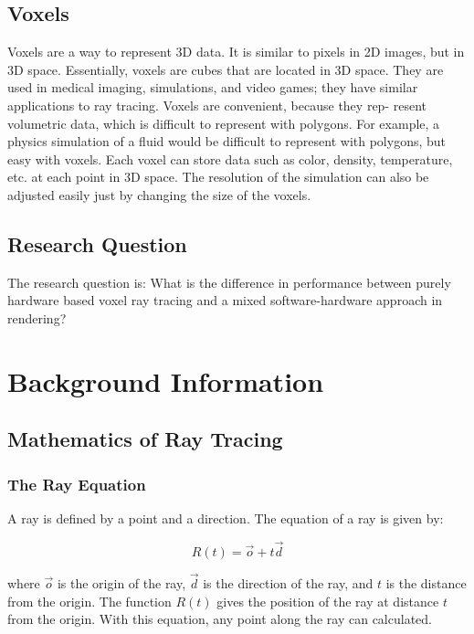 \documentclass[12pt]{article}
\begin{document}
\subsection{Voxels}

Voxels are a way to represent 3D data. It is similar to pixels in 2D images,
but in 3D space. Essentially, voxels are cubes that are located in 3D space.
They are used in medical imaging, simulations, and video games; they have
similar applications to ray tracing. Voxels are convenient, because they rep-
resent volumetric data, which is difficult to represent with polygons. For
example, a physics simulation of a fluid would be difficult to represent with
polygons, but easy with voxels. Each voxel can store data such as color,
density, temperature, etc. at each point in 3D space. The resolution of the
simulation can also be adjusted easily just by changing the size of the voxels.

\subsection{Research Question}

The research question is: What is the difference in performance between
purely hardware based voxel ray tracing and a mixed software-hardware approach in rendering?

\section{Background Information}

\subsection{Mathematics of Ray Tracing}
\subsubsection{The Ray Equation}

A ray is defined by a point and a direction. The equation of a ray is given by:

\begin{equation}
    R(t) = \vec{o} + t\vec{d}
\end{equation}

where $\vec{o}$ is the origin of the ray, $\vec{d}$ is the direction of the ray, and $t$ is the distance from the origin.
The function $R(t)$ gives the position of the ray at distance $t$ from the origin.
With this equation, any point along the ray can calculated.
\end{document}
